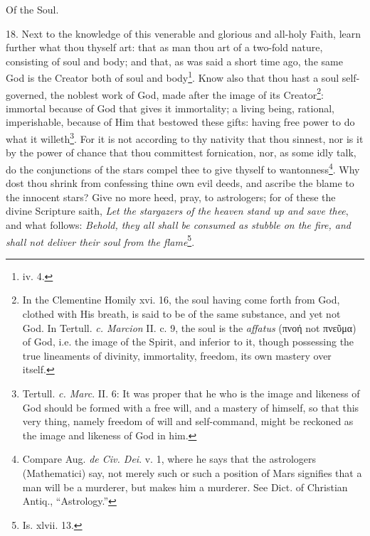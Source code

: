 Of the Soul.

18. Next to the knowledge of this venerable and glorious and all-holy Faith, learn further what thou thyself art: that as man thou art of a two-fold nature, consisting of soul and body; and that, as was said a short time ago, the same God is the Creator both of soul and body\footnote{iv. 4.}. Know also that thou hast a soul self-governed, the noblest work of God, made after the image of its Creator\footnote{In the Clementine Homily xvi. 16, the soul having come forth from God, clothed with His breath, is said to be of the same substance, and yet not God. In Tertull. \emph{c. Marcion} II. c. 9, the soul is the \emph{affatus} (\textgreek{πνοή} not \textgreek{πνεῦμα}) of God, i.e. the image of the Spirit, and inferior to it, though possessing the true lineaments of divinity, immortality, freedom, its own mastery over itself.}: immortal because of God that gives it immortality; a living being, rational, imperishable, because of Him that bestowed these gifts: having free power to do what it willeth\footnote{Tertull. \emph{c. Marc}. II. 6: It was proper that he who is the image and likeness of God should be formed with a free will, and a mastery of himself, so that this very thing, namely freedom of will and self-command, might be reckoned as the image and likeness of God in him.}. For it is not according to thy nativity that thou sinnest, nor is it by the power of chance that thou committest fornication, nor, as some idly talk, do the conjunctions of the stars compel thee to give thyself to wantonness\footnote{Compare Aug. \emph{de Civ. Dei}. v. 1, where he says that the astrologers (Mathematici) say, not merely such or such a position of Mars signifies that a man will be a murderer, but makes him a murderer. See Dict. of Christian Antiq., “Astrology.”}. Why dost thou shrink from confessing thine own evil deeds, and ascribe the blame to the innocent stars? Give no more heed, pray, to astrologers; for of these the divine Scripture saith, \emph{Let the stargazers of the heaven stand up and save thee}, and what follows: \emph{Behold, they all shall be consumed as stubble on the fire, and shall not deliver their soul from the flame}\footnote{Is. xlvii. 13.}.

